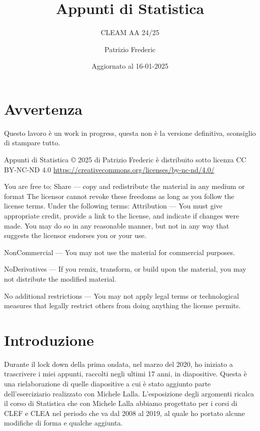 \documentclass[
  11pt,
]{book}
\title{Appunti di Statistica}
\subtitle{CLEAM AA 24/25}
\author{Patrizio Frederic}
\date{Aggiornato al 16-01-2025}
\theoremstyle{mytheoremstyle}
\theoremstyle{mydefstyle}
\begin{document}
\maketitle

{
\setcounter{tocdepth}{2}
\tableofcontents
}
\chapter*{Avvertenza}\label{avvertenza}

\large

Questo lavoro è un work in progress, questa non è la versione definitiva, sconsiglio di stampare tutto.

\normalsize

Appunti di Statistica © 2025 di Patrizio Frederic è distribuito
sotto licenza CC BY-NC-ND 4.0
\url{https://creativecommons.org/licenses/by-nc-nd/4.0/}

You are free to:
Share --- copy and redistribute the material in any medium or format
The licensor cannot revoke these freedoms as long as you follow the license terms.
Under the following terms:
Attribution --- You must give appropriate credit, provide a link to the license, and indicate if changes were made. You may do so in any reasonable manner, but not in any way that suggests the licensor endorses you or your use.

NonCommercial --- You may not use the material for commercial purposes.

NoDerivatives --- If you remix, transform, or build upon the material, you may not distribute the modified material.

No additional restrictions --- You may not apply legal terms or technological measures that legally restrict others from doing anything the license permits.

\chapter*{Introduzione}\label{introduzione}

Durante il lock down della prima ondata, nel marzo del 2020, ho iniziato a trascrivere
i miei appunti, raccolti negli ultimi 17 anni, in diapositive. Questa è una rielaborazione
di quelle diapositive a cui è stato aggiunto parte dell'eserciziario realizzato con Michele Lalla.
L'esposizione degli argomenti ricalca il corso di Statistica che con Michele Lalla abbiamo
progettato per i corsi di CLEF e CLEA nel periodo che va dal 2008 al 2019, al quale ho
portato alcune modifiche di forma e qualche aggiunta.
\end{document}
